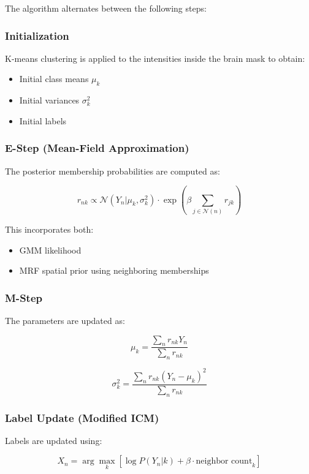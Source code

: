 \documentclass[11pt]{article}
\begin{document}
The algorithm alternates between the following steps:

\subsubsection{Initialization}

K-means clustering is applied to the intensities inside the brain mask to obtain:

\begin{itemize}
\item Initial class means $\mu_k$
\item Initial variances $\sigma_k^2$
\item Initial labels
\end{itemize}


\subsubsection{E-Step (Mean-Field Approximation)}

The posterior membership probabilities are computed as:

\[
r_{nk} \propto \mathcal{N}(Y_n | \mu_k, \sigma_k^2) \cdot \exp\left(\beta \sum_{j \in \mathcal{N}(n)} r_{jk}\right)
\]

This incorporates both:

\begin{itemize}
\item GMM likelihood
\item MRF spatial prior using neighboring memberships
\end{itemize}


\subsubsection{M-Step}

The parameters are updated as:

\[
\mu_k = \frac{\sum_n r_{nk} Y_n}{\sum_n r_{nk}}
\]

\[
\sigma_k^2 = \frac{\sum_n r_{nk}(Y_n - \mu_k)^2}{\sum_n r_{nk}}
\]


\subsubsection{Label Update (Modified ICM)}

Labels are updated using:

\[
X_n = \arg\max_k \left[
\log P(Y_n | k) + \beta \cdot \text{neighbor count}_k
\right]
\]
\end{document}
